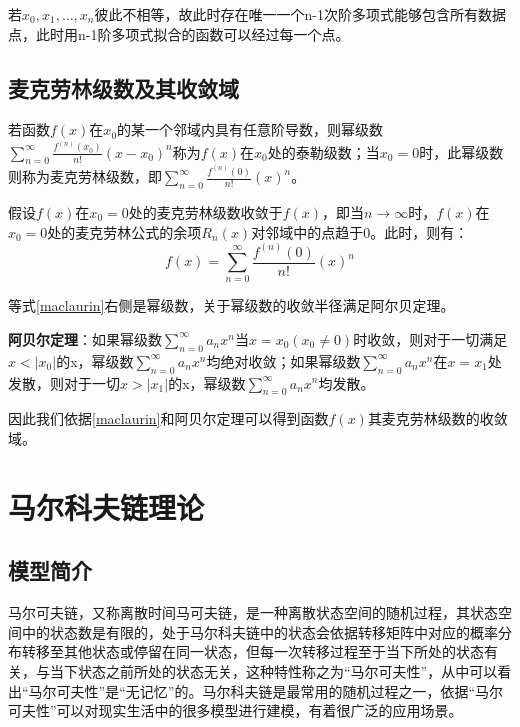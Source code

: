 若$x_0,x_1,…,x_n$彼此不相等，故此时存在唯一一个n-1次阶多项式能够包含所有数据点，此时用n-1阶多项式拟合的函数可以经过每一个点。

\subsection{麦克劳林级数及其收敛域}
若函数$f(x)$在$x_0$的某一个邻域内具有任意阶导数，则幂级数$\sum_{n=0}^{\infty}{\frac{f^{\left( n \right)}\left( x_0 \right)}{n!}}\left( x-x_0 \right) ^n$称为$f(x)$在$x_0$处的泰勒级数；当$x_0=0$时，此幂级数则称为麦克劳林级数，即$\sum_{n=0}^{\infty}{\frac{f^{\left( n \right)}\left( 0 \right)}{n!}}\left( x \right) ^n$。

假设$f(x)$在$x_0=0$处的麦克劳林级数收敛于$f(x)$，即当$n\rightarrow \infty $时，$f(x)$在$x_0=0$处的麦克劳林公式的余项$R_n(x)$对邻域中的点趋于0。此时，则有：
\begin{equation}
\label{maclaurin}
f\left( x \right) =\sum_{n=0}^{\infty}{\frac{f^{\left( n \right)}\left( 0 \right)}{n!}}\left( x \right) ^n
\end{equation}

等式\ref{maclaurin}右侧是幂级数，关于幂级数的收敛半径满足阿尔贝定理。

\textbf{阿贝尔定理}：如果幂级数$\sum_{n=0}^{\infty}{a_nx^n}$当$x=x_0(x_0 \ne 0)$时收敛，则对于一切满足$x<|x_0|$的x，幂级数$\sum_{n=0}^{\infty}{a_nx^n}$均绝对收敛；如果幂级数$\sum_{n=0}^{\infty}{a_nx^n}$在$x=x_1$处发散，则对于一切$x>|x_1|$的x，幂级数$\sum_{n=0}^{\infty}{a_nx^n}$均发散。

因此我们依据\ref{maclaurin}和阿贝尔定理可以得到函数$f(x)$其麦克劳林级数的收敛域。


\section{马尔科夫链理论}

\subsection{模型简介}

马尔可夫链，又称离散时间马可夫链，是一种离散状态空间的随机过程，其状态空间中的状态数是有限的，处于马尔科夫链中的状态会依据转移矩阵中对应的概率分布转移至其他状态或停留在同一状态，但每一次转移过程至于当下所处的状态有关，与当下状态之前所处的状态无关，这种特性称之为“马尔可夫性”，从中可以看出“马尔可夫性”是“无记忆”的。马尔科夫链是最常用的随机过程之一，依据“马尔可夫性”可以对现实生活中的很多模型进行建模，有着很广泛的应用场景。

